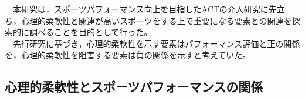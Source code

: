 \documentclass[12pt,a4paper,xelatex,ja=standard]{bxjsarticle}
\begin{document}
　本研究は，スポーツパフォーマンス向上を目指したACTの介入研究に先立ち，心理的柔軟性と関連が高いスポーツをする上で重要になる要素との関連を探索的に調べることを目的として行った。\\
　先行研究に基づき，心理的柔軟性を示す要素はパフォーマンス評価と正の関係を，心理的柔軟性を阻害する要素は負の関係を示すと考えていた。

\hypertarget{ux5fc3ux7406ux7684ux67d4ux8edfux6027ux3068ux30b9ux30ddux30fcux30c4ux30d1ux30d5ux30a9ux30fcux30deux30f3ux30b9ux306eux95a2ux4fc2}{%
\subsection{心理的柔軟性とスポーツパフォーマンスの関係}\label{ux5fc3ux7406ux7684ux67d4ux8edfux6027ux3068ux30b9ux30ddux30fcux30c4ux30d1ux30d5ux30a9ux30fcux30deux30f3ux30b9ux306eux95a2ux4fc2}}
\end{document}
